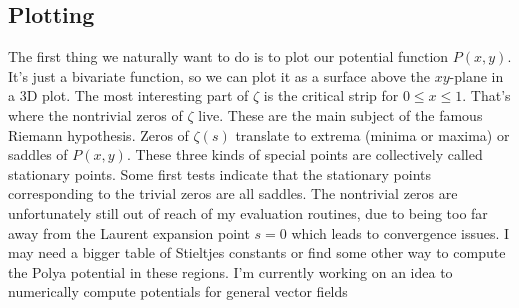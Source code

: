 \documentclass[12pt]{article}
\begin{document}
\subsection{Plotting}
The first thing we naturally want to do is to plot our potential function $P(x,y)$. It's just a bivariate function, so we can plot it as a surface above the $xy$-plane in a 3D plot. The most interesting part of $\zeta$ is the critical strip for $0 \leq x \leq 1$. That's where the nontrivial zeros of $\zeta$ live. These are the main subject of the famous Riemann hypothesis. Zeros of $\zeta(s)$ translate to extrema (minima or maxima) or saddles of $P(x,y)$. These three kinds of special points are collectively called stationary points. Some first tests indicate that the stationary points corresponding to the trivial zeros are all saddles. The nontrivial zeros are unfortunately still out of reach of my evaluation routines, due to being too far away from the Laurent expansion point $s=0$ which leads to convergence issues. I may need a bigger table of Stieltjes constants or find some other way to compute the Polya potential in these regions. I'm currently working on an idea to numerically compute potentials for general vector fields

\end{document}
